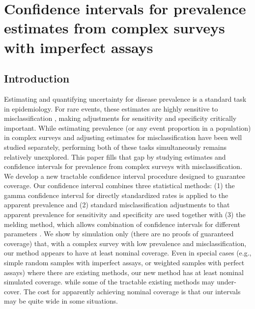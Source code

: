 \chapter{Confidence intervals for prevalence estimates from complex surveys with imperfect assays}
\label{ch:content_1}
\graphicspath{{figures/ch_3/}}

\section{Introduction}

Estimating and quantifying uncertainty for disease prevalence is a standard task in epidemiology.
For rare events, these estimates are highly sensitive to misclassification \citep{hemenwaySelfDefense}, making adjustments for sensitivity and specificity critically important.
While estimating prevalence (or any event proportion in a population) in complex surveys and adjusting estimates for misclassification have been well studied separately, performing both of these tasks simultaneously remains relatively unexplored. This paper fills that gap by studying estimates and confidence intervals for prevalence from complex surveys with misclassification.
We develop a new tractable confidence interval procedure designed to guarantee coverage.
Our confidence interval combines three statistical methods: (1) the gamma confidence interval for directly standardized rates is applied to the apparent prevalence \citep{FayF:1997}
and (2) standard misclassification adjustments to that apparent prevalence for sensitivity and specificity \citep{Roga:1978} are used together with (3) the melding method, which allows combination of confidence intervals for different parameters \citep{FayP:2015}.
We show by simulation only (there are no proofs of guaranteed coverage) that, with a complex survey with low prevalence and misclassification, our method appears to have at least nominal coverage.
Even in special cases (e.g., simple random samples with imperfect assays, or weighted samples with perfect assays) where there are existing methods, our new method has at least nominal simulated coverage. while some of the tractable existing methods may under-cover.
The cost for apparently achieving nominal coverage is that our intervals may be quite wide in some situations.


